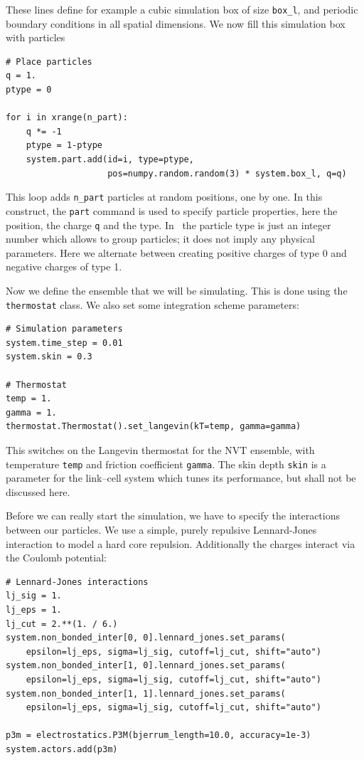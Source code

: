\documentclass[
a4paper,                        %
11pt,                           %
twoside,                        %
footsepline,                    %
headsepline,                    %
headexclude,                    %
footexclude,                    %
pagesize,                       %
]{scrartcl}
\begin{document}
These lines define for example a cubic simulation box of size 
\verb|box_l|, and periodic boundary conditions in all spatial dimensions. 
We now fill this simulation box with particles

\begin{lstlisting}
# Place particles
q = 1.
ptype = 0

for i in xrange(n_part):
    q *= -1
    ptype = 1-ptype
    system.part.add(id=i, type=ptype, 
                    pos=numpy.random.random(3) * system.box_l, q=q)
\end{lstlisting}

This loop adds \verb|n_part| particles at random positions, one by
one.  In this construct, the \verb|part| command is used to specify 
particle properties, here the position, the charge \verb|q| and the type. 
In \es\ the particle type is just an integer number which allows to group
particles; it does not imply any physical parameters. Here we 
alternate between creating positive charges of type 0 and negative
charges of type 1.

Now we define the ensemble that we will be simulating. This is done
using the \verb|thermostat| class. We also set some integration
scheme parameters:

\begin{lstlisting}
# Simulation parameters
system.time_step = 0.01
system.skin = 0.3

# Thermostat
temp = 1.
gamma = 1.
thermostat.Thermostat().set_langevin(kT=temp, gamma=gamma)
\end{lstlisting}

This switches on the Langevin thermostat for the NVT ensemble, with
temperature \verb|temp| and friction coefficient \verb|gamma|. The skin depth
\verb|skin| is a parameter for the link--cell system which tunes its
performance, but shall not be discussed here.

Before we can really start the simulation, we have to specify the
interactions between our particles.  We use a simple, purely repulsive
Lennard-Jones interaction to model a hard core repulsion. Additionally the
charges interact via the Coulomb potential:

\begin{lstlisting}
# Lennard-Jones interactions
lj_sig = 1.
lj_eps = 1.
lj_cut = 2.**(1. / 6.)
system.non_bonded_inter[0, 0].lennard_jones.set_params(
    epsilon=lj_eps, sigma=lj_sig, cutoff=lj_cut, shift="auto")
system.non_bonded_inter[1, 0].lennard_jones.set_params(
    epsilon=lj_eps, sigma=lj_sig, cutoff=lj_cut, shift="auto")
system.non_bonded_inter[1, 1].lennard_jones.set_params(
    epsilon=lj_eps, sigma=lj_sig, cutoff=lj_cut, shift="auto")

p3m = electrostatics.P3M(bjerrum_length=10.0, accuracy=1e-3)
system.actors.add(p3m)
\end{lstlisting}
\end{document}
